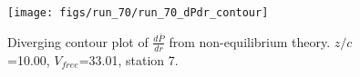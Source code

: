 \begin{figure}[H]
\centering
\texttt{[image: figs/run\_70/run\_70\_dPdr\_contour]}
\caption{Diverging contour plot of $\frac{d\bar{P}}{dr}$ from non-equilibrium theory. $z/c$=10.00, $V_{free}$=33.01, station 7.}
\label{fig:run_70_dPdr_contour}
\end{figure}


